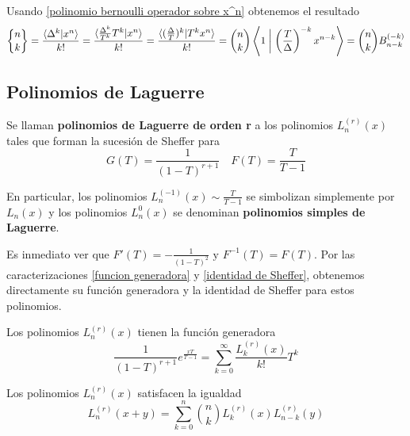 \begin{demo}
    Usando \ref{polinomio bernoulli operador sobre x^n} obtenemos el resultado
    \begin{align*}
        {n \brace k} = \frac{\langle \Delta^k | x^n \rangle}{k!} = \frac{\langle \frac{\Delta^k}{T^k} T^k | x^n \rangle}{k!} = \frac{\langle (\frac{\Delta}{T})^k | T^k x^n \rangle}{k!} = \binom{n}{k} \left\langle 1 \biggm| \left(\frac{T}{\Delta}\right)^{-k} x^{n-k} \right\rangle = \binom{n}{k}B_{n-k}^{(-k)}
    \end{align*}
\end{demo}



\subsection{Polinomios de Laguerre}

\begin{definicion}
    Se llaman \textbf{polinomios de Laguerre de orden r} a los polinomios $L_n^{(r)}(x)$ tales que forman la sucesión de Sheffer para
    \begin{equation*}
        G(T) = \frac{1}{(1-T)^{r+1}} \quad F(T) = \frac{T}{T-1}
    \end{equation*}

    En particular, los polinomios $L_n^{(-1)}(x) \sim \frac{T}{T-1}$ se simbolizan simplemente por $L_n(x)$ y los polinomios $L_n^{0}(x)$ se denominan \textbf{polinomios simples de Laguerre}.
\end{definicion}

Es inmediato ver que $F'(T) = -\frac{1}{(1-T)^2} \text{ y } F^{-1}(T) = F(T)$. Por las caracterizaciones \ref{funcion generadora} y \ref{identidad de Sheffer}, obtenemos directamente su función generadora y la identidad de Sheffer para estos polinomios.

\begin{proposicion}
    Los polinomios $L_n^{(r)}(x)$ tienen la función generadora
    \begin{equation*}
        \frac{1}{(1-T)^{r+1}}e^{\frac{xT}{T-1}} = \sum_{k=0}^\infty \frac{L_k^{(r)}(x)}{k!}T^k
    \end{equation*}
\end{proposicion}

\begin{proposicion}
    Los polinomios $L_n^{(r)}(x)$ satisfacen la igualdad
    \begin{equation*}
        L_n^{(r)}(x+y) = \sum_{k=0}^n \binom{n}{k} L_k^{(r)}(x) L_{n-k}^{(r)}(y)
    \end{equation*}
\end{proposicion}

